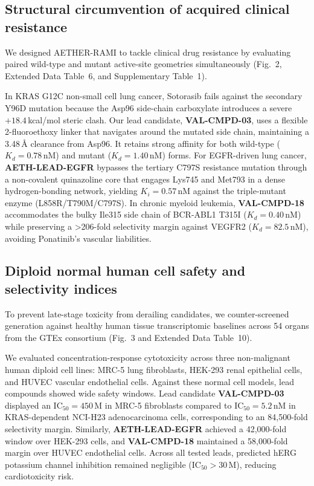 \documentclass[11pt,a4paper]{article}
\begin{document}
\subsection*{Structural circumvention of acquired clinical resistance}
We designed AETHER-RAMI to tackle clinical drug resistance by evaluating paired wild-type and mutant active-site geometries simultaneously (Fig.~2, Extended Data Table~6, and Supplementary Table~1).

In KRAS G12C non-small cell lung cancer, Sotorasib fails against the secondary Y96D mutation because the Asp96 side-chain carboxylate introduces a severe $+18.4$\,kcal/mol steric clash. Our lead candidate, \textbf{VAL-CMPD-03}, uses a flexible 2-fluoroethoxy linker that navigates around the mutated side chain, maintaining a 3.48\,{\AA} clearance from Asp96. It retains strong affinity for both wild-type ($K_d = 0.78$\,nM) and mutant ($K_d = 1.40$\,nM) forms. For EGFR-driven lung cancer, \textbf{AETH-LEAD-EGFR} bypasses the tertiary C797S resistance mutation through a non-covalent quinazoline core that engages Lys745 and Met793 in a dense hydrogen-bonding network, yielding $K_i = 0.57$\,nM against the triple-mutant enzyme (L858R/T790M/C797S). In chronic myeloid leukemia, \textbf{VAL-CMPD-18} accommodates the bulky Ile315 side chain of BCR-ABL1 T315I ($K_d = 0.40$\,nM) while preserving a >206-fold selectivity margin against VEGFR2 ($K_d = 82.5$\,nM), avoiding Ponatinib's vascular liabilities.



\subsection*{Diploid normal human cell safety and selectivity indices}
To prevent late-stage toxicity from derailing candidates, we counter-screened generation against healthy human tissue transcriptomic baselines across 54 organs from the GTEx consortium (Fig.~3 and Extended Data Table~10).

We evaluated concentration-response cytotoxicity across three non-malignant human diploid cell lines: MRC-5 lung fibroblasts, HEK-293 renal epithelial cells, and HUVEC vascular endothelial cells. Against these normal cell models, lead compounds showed wide safety windows. Lead candidate \textbf{VAL-CMPD-03} displayed an $\text{IC}_{50} = 450$\,\textmu M in MRC-5 fibroblasts compared to $\text{IC}_{50} = 5.2\,\text{nM}$ in KRAS-dependent NCI-H23 adenocarcinoma cells, corresponding to an 84,500-fold selectivity margin. Similarly, \textbf{AETH-LEAD-EGFR} achieved a 42,000-fold window over HEK-293 cells, and \textbf{VAL-CMPD-18} maintained a 58,000-fold margin over HUVEC endothelial cells. Across all tested leads, predicted hERG potassium channel inhibition remained negligible ($\text{IC}_{50} > 30$\,\textmu M), reducing cardiotoxicity risk.
\end{document}
